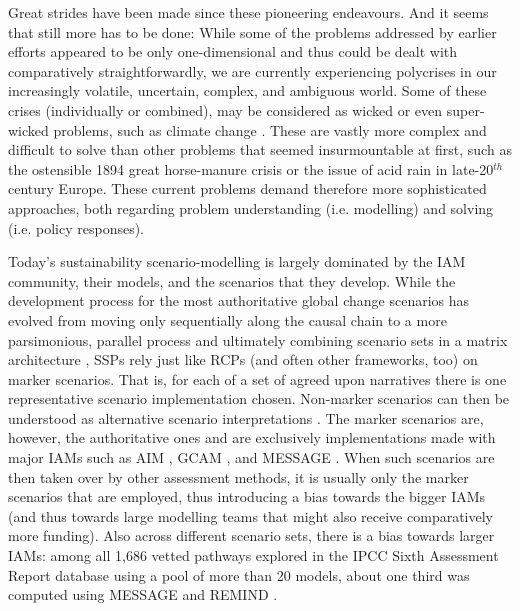 \documentclass{article}
\begin{document}
\begin{refsection}

Great strides have been made since these pioneering endeavours. And it seems that still more has to be done: While some of the problems addressed by earlier efforts appeared to be only one-dimensional and thus could be dealt with comparatively straightforwardly, we are currently experiencing polycrises in our increasingly volatile, uncertain, complex, and ambiguous world. Some of these crises (individually or combined), may be considered as wicked \parencite{rittel_1973, termeer_2019,lonngren_2021} or even super-wicked problems, such as climate change \parencite{levin_2012}. These are vastly more complex and difficult to solve than other problems that seemed insurmountable at first, such as the ostensible 1894 great horse-manure crisis or the issue of acid rain in late-20$^{th}$ century Europe. These current problems demand therefore more sophisticated approaches, both regarding problem understanding (i.e. modelling) and solving (i.e. policy responses). 

Today's sustainability scenario-modelling is largely dominated by the IAM community, their models, and the scenarios that they develop. While the development process for the most authoritative global change scenarios has evolved from moving only sequentially along the causal chain to a more parsimonious, parallel process \parencite{moss_2010} and ultimately combining scenario sets in a matrix architecture \parencite{vanvuuren_2014},\footnotemark{} SSPs rely just like RCPs (and often other frameworks, too) on marker scenarios. That is, for each of a set of agreed upon narratives there is one representative scenario implementation chosen. Non-marker scenarios can then be understood as alternative scenario interpretations \parencite{riahi_2017}. The marker scenarios are, however, the authoritative ones and are exclusively implementations made with major IAMs such as AIM \parencite{fujimori_2017}, GCAM \parencite{calvin_2017}, and MESSAGE \parencite{fricko_20171}. When such scenarios are then taken over by other assessment methods, it is usually only the marker scenarios that are employed, thus introducing a bias towards the bigger IAMs (and thus towards large modelling teams that might also receive comparatively more funding). Also across different scenario sets, there is a bias towards larger IAMs: among all 1,686 vetted pathways explored in the IPCC Sixth Assessment Report database using a pool of more than 20 models, about one third was computed using MESSAGE and REMIND \parencite{gambhir_2022,byers_2022}.


\end{refsection}
\end{document}
